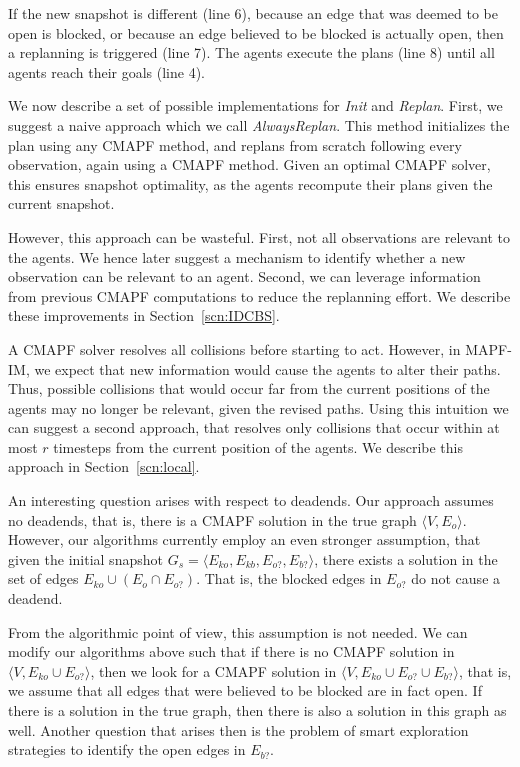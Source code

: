 \documentclass[letterpaper]{article} %
\def\
UrlFont{\rm}  %
\newcommand{\eko}{E_{ko}} %
\newcommand{\ekb}{E_{kb}} %
\newcommand{\eao}{E_{o?}} %
\newcommand{\eab}{E_{b?}} %
\theoremstyle{definition}
\begin{document}
If the new snapshot is different (line 6), because an edge that was deemed to be open is blocked, or because an edge believed to be blocked is actually open, then a replanning is triggered (line 7).
The agents execute the plans (line 8) until all agents reach their goals (line 4).

We now describe a set of possible implementations for {\em Init} and {\em Replan}. First, we suggest a naive approach which we call {\em AlwaysReplan}. This method initializes the plan using any CMAPF method, and replans from scratch following every observation, again using a CMAPF method. Given an optimal CMAPF solver, this ensures snapshot optimality, as the agents recompute their plans given the current snapshot.


However, this approach can be  wasteful. First, not all observations are relevant to the agents. We hence later suggest a mechanism to identify whether a new observation can be relevant to an agent. Second, we can leverage information from previous CMAPF computations to reduce the replanning effort. We describe these improvements in Section~\ref{scn:IDCBS}.

A CMAPF solver resolves all collisions before starting to act. However, in MAPF-IM, we expect that new information would cause the agents to alter their paths. Thus, possible collisions that would occur far from the current positions of the agents may no longer be relevant, given the revised paths. Using this intuition we can suggest a second approach, that resolves only collisions that occur within at most $r$ timesteps from the current position of the agents. We describe this approach in Section~\ref{scn:local}.


An interesting question arises with respect to deadends. Our approach assumes no deadends, that is, there is a CMAPF solution in the true graph $\langle V, E_o \rangle$. However, our algorithms currently employ an even stronger assumption, that given the initial snapshot $G_s=\langle \eko, \ekb, \eao, \eab \rangle$, there exists a solution in the set of edges $\eko \cup (E_o \cap \eao)$. That is, the blocked edges in $\eao$ do not cause a deadend.

From the algorithmic point of view, this assumption is not needed.
We can modify our algorithms above such that if there is no CMAPF solution in $\langle V, \eko \cup \eao \rangle$, then we look for a CMAPF solution in $\langle V, \eko \cup \eao \cup \eab \rangle $, that is, we assume that all edges that were believed to be blocked are in fact open. If there is a solution in the true graph, then there is also a solution in this graph as well. Another question that arises then is the problem of smart exploration strategies to identify the open edges in $\eab$.
\end{document}
